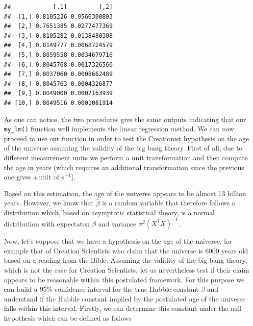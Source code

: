 \documentclass[12pt,]{krantz}
\newenvironment{Shaded}{\begin{snugshade}}{\end{snugshade}}
\newcommand{\DecValTok}[1]{\textcolor[rgb]{0.06,0.06,0.06}{#1}}
\newcommand{\FloatTok}[1]{\textcolor[rgb]{0.06,0.06,0.06}{#1}}
\newcommand{\StringTok}[1]{\textcolor[rgb]{0.5,0.5,0.5}{#1}}
\newcommand{\CommentTok}[1]{\textcolor[rgb]{0.37,0.37,0.37}{\textit{#1}}}
\newcommand{\OperatorTok}[1]{\textcolor[rgb]{0.43,0.43,0.43}{\textbf{#1}}}
\newcommand{\NormalTok}[1]{#1}
\begin{document}
\begin{verbatim}
##            [,1]         [,2]
##  [1,] 0.8105226 0.0566300803
##  [2,] 0.7651385 0.0277477369
##  [3,] 0.8105282 0.0138480308
##  [4,] 0.8149777 0.0068724579
##  [5,] 0.8059558 0.0034679716
##  [6,] 0.8045768 0.0017326560
##  [7,] 0.8037060 0.0008662489
##  [8,] 0.8045763 0.0004326877
##  [9,] 0.8049000 0.0002163939
## [10,] 0.8049516 0.0001081914
\end{verbatim}

As one can notice, the two procedures give the same outputs indicating
that our \texttt{my\_lm()} function well implements the linear
regression method. We can now proceed to use our function in order to
test the Creationist hypothesis on the age of the universe assuming the
validity of the big bang theory. First of all, due to different
measurement units we perform a unit transformation and then compute the
age in years (which requires an additional transformation since the
previous one gives a unit of \(s^{-1}\)).

\begin{Shaded}
\end{Shaded}

Based on this estimation, the age of the universe appears to be almost
13 billion years. However, we know that \(\hat{\beta}\) is a random
variable that therefore follows a distribution which, based on
asymptotic statistical theory, is a normal distribution with expectaton
\(\beta\) and variance \(\sigma^2(X^TX)^{-1}\).

Now, let's suppose that we have a hypothesis on the age of the universe,
for example that of Creation Scientists who claim that the universe is
6000 years old based on a reading from the Bible. Assuming the validity
of the big bang theory, which is not the case for Creation Scientists,
let us nevertheless test if their claim appears to be reasonable within
this postulated framework. For this purpose we can build a 95\%
confidence interval for the true Hubble constant \(\beta\) and
understand if the Hubble constant implied by the postulated age of the
universe falls within this interval. Firstly, we can determine this
constant under the null hypothesis which can be defined as follows
\end{document}
